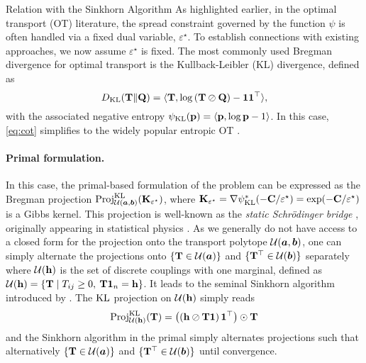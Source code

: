 \begin{mem1}{Relation with the Sinkhorn Algorithm}
    As highlighted earlier, in the optimal transport (OT) literature, the spread constraint governed by the function $\psi$ is often handled via a fixed dual variable, $\varepsilon^\star$. To establish connections with existing approaches, we now assume $\varepsilon^\star$ is fixed. The most commonly used Bregman divergence for optimal transport is the Kullback-Leibler (KL) divergence, defined as
    \[
    D_{\operatorname{KL}}({\mathbf{T}} \| {\mathbf{Q}}) = \langle {\mathbf{T}}, \log \left( {\mathbf{T}} \oslash {\mathbf{Q}} \right) - \bm{1} \bm{1}^\top \rangle,
    \]
    with the associated negative entropy $\psi_{\operatorname{KL}}(\mathbf{p}) = \langle \mathbf{p}, \log \mathbf{p} - 1 \rangle$.
    In this case, \eqref{eq:cot} simplifies to the widely popular entropic OT \citep{cuturi2013sinkhorn}.

    
    \paragraph{Primal formulation.}
    In this case, the primal-based formulation of the problem can be expressed as the Bregman projection $\operatorname{Proj}^{\operatorname{KL}}_{{\mathcal{U}}(\bm{a}, \bm{b})}({\mathbf{K}}_{\varepsilon^\star})$, where ${\mathbf{K}}_{\varepsilon^\star} = \nabla \psi_{\operatorname{KL}}^{*}(-{\mathbf{C}} / \varepsilon^\star) = \exp(-{\mathbf{C}} / \varepsilon^\star)$ is a Gibbs kernel. This projection is well-known as the \emph{static Schrödinger bridge} \citep{leonard2013survey}, originally appearing in statistical physics \citep{schrodinger1931umkehrung}.  As we generally do not have access to a closed form for the projection onto the transport polytope ${\mathcal{U}}(\bm{a}, \bm{b})$, one can simply alternate the projections onto $\{ {\mathbf{T}} \in {\mathcal{U}}(\bm{a}) \}$ and $\{ {\mathbf{T}}^\top \in {\mathcal{U}}(\bm{b}) \}$ separately where ${\mathcal{U}}({\mathbf{h}})$ is the set of discrete couplings with one marginal, defined as ${\mathcal{U}}({\mathbf{h}}) = \left\{{\mathbf{T}} \mid T_{ij} \geq 0, \: {\mathbf{T}} \mathbf{1}_n = {\mathbf{h}} \right\}$. It leads to the seminal Sinkhorn algorithm introduced by \cite{cuturi2013sinkhorn}.
    The $\operatorname{KL}$ projection on ${\mathcal{U}}({\mathbf{h}})$ simply reads
    \begin{align}
        \operatorname{Proj}^{\operatorname{KL}}_{{\mathcal{U}}({\mathbf{h}})}({\mathbf{T}}) = \left(\left({\mathbf{h}} \oslash {\mathbf{T}} \bm{1}  \right) \bm{1}^\top \right) \odot {\mathbf{T}}
    \end{align}
    and the Sinkhorn algorithm in the primal simply alternates projections such that alternatively $\{ {\mathbf{T}} \in {\mathcal{U}}(\bm{a}) \}$ and $\{ {\mathbf{T}}^\top \in {\mathcal{U}}(\bm{b}) \}$ until convergence.


\end{mem1}
